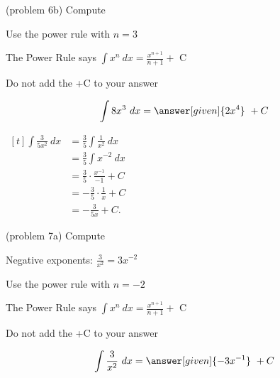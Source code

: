 \documentclass{ximera}
\begin{document}
\begin{problem}(problem 6b)
Compute 

\begin{hint}
Use the power rule with $n=3$
\end{hint}
\begin{hint}
The Power Rule says $\int x^n \ dx = \frac{x^{n+1}}{n+1} +$ C
\end{hint}
\begin{hint}
\begin{center}
Do not add the +C to your answer
\end{center}
\end{hint}

\[
\int 8x^3 \ dx =
\answer[given]{2x^4} \ + C
\]
\end{problem}


\begin{example}[example 7]
$\begin{aligned}[t]
\int \frac{3}{5x^2} \ dx &= \frac{3}{5} \int \frac{1}{x^2} \ dx \\[3pt]
&=\frac{3}{5} \int x^{-2} \ dx \\[3pt]
&= \frac{3}{5} \cdot \frac{x^{-1}}{-1} +C \\[5pt]
&= -\frac{3}{5} \cdot \frac{1}{x} +C \\[5pt]
&= -\frac{3}{5x} +C.
\end{aligned}$
\end{example}


\begin{problem}(problem 7a)
Compute 

\begin{hint}
Negative exponents: $\frac{3}{x^2} = 3x^{-2}$
\end{hint}
\begin{hint}
Use the power rule with $n=-2$
\end{hint}
\begin{hint}
The Power Rule says $\int x^n \ dx = \frac{x^{n+1}}{n+1} +$ C
\end{hint}
\begin{hint}
\begin{center}
Do not add the +C to your answer
\end{center}
\end{hint}

\[
\int \frac{3}{x^2} \ dx =
\answer[given]{-3x^{-1}} \ + C
\]
\end{problem}
\end{document}
